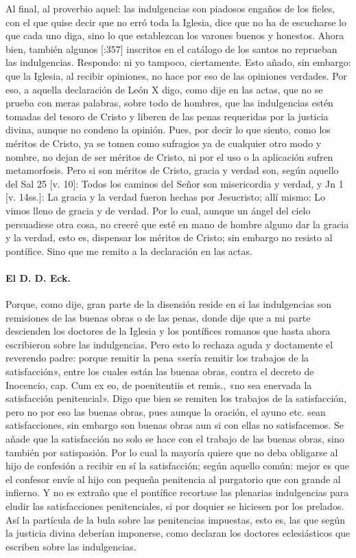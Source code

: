 Al final, al proverbio aquel: las indulgencias son piadosos engaños de los fieles, con el que quise decir que no erró toda la Iglesia, dice que no ha de escucharse lo que cada uno diga, sino lo que establezcan los varones buenos y honestos. Ahora bien, también algunos [:357] inscritos en el catálogo de los santos no reprueban las indulgencias. Respondo: ni yo tampoco, ciertamente. Esto añado, sin embargo: que la Iglesia, al recibir opiniones, no hace por eso de las opiniones verdades. Por eso, a aquella declaración de León X digo, como dije en las actas, que no se prueba con meras palabras, sobre todo de hombres, que las indulgencias estén tomadas del tesoro de Cristo y liberen de las penas requeridas por la justicia divina, aunque no condeno la opinión. Pues, por decir lo que siento, como los méritos de Cristo, ya se tomen como sufragios ya de cualquier otro modo y nombre, no dejan de ser méritos de Cristo, ni por el uso o la aplicación sufren metamorfosis. Pero si son méritos de Cristo, gracia y verdad son, según aquello del Sal 25 [v. 10]: Todos los caminos del Señor son misericordia y verdad, y Jn 1 [v. 14ss.]: La gracia y la verdad fueron hechas por Jesucristo; allí mismo: Lo vimos lleno de gracia y de verdad. Por lo cual, aunque un ángel del cielo persuadiese otra cosa, no creeré que esté en mano de hombre alguno dar la gracia y la verdad, esto es, dispensar los méritos de Cristo; sin embargo no resisto al pontífice. Sino que me remito a la declaración en las actas.

\paragraph*{El D. D. Eck.}

Porque, como dije, gran parte de la disensión reside en si las indulgencias son remisiones de las buenas obras o de las penas, donde dije que a mi parte descienden los doctores de la Iglesia y los pontífices romanos que hasta ahora escribieron sobre las indulgencias. Pero esto lo rechaza aguda y doctamente el reverendo padre: porque remitir la pena «sería remitir los trabajos de la satisfacción», entre los cuales están las buenas obras, contra el decreto de Inocencio, cap. Cum ex eo, de poenitentiis et remis., «no sea enervada la satisfacción penitencial». Digo que bien se remiten los trabajos de la satisfacción, pero no por eso las buenas obras, pues aunque la oración, el ayuno etc. sean satisfacciones, sin embargo son buenas obras aun si con ellas no satisfacemos. Se añade que la satisfacción no solo se hace con el trabajo de las buenas obras, sino también por satispasión. Por lo cual la mayoría quiere que no deba obligarse al hijo de confesión a recibir en sí la satisfacción; según aquello común: mejor es que el confesor envíe al hijo con pequeña penitencia al purgatorio que con grande al infierno. Y no es extraño que el pontífice recortase las plenarias indulgencias para eludir las satisfacciones penitenciales, si por doquier se hiciesen por los prelados. Así la partícula de la bula sobre las penitencias impuestas, esto es, las que según la justicia divina deberían imponerse, como declaran los doctores eclesiásticos que escriben sobre las indulgencias.

